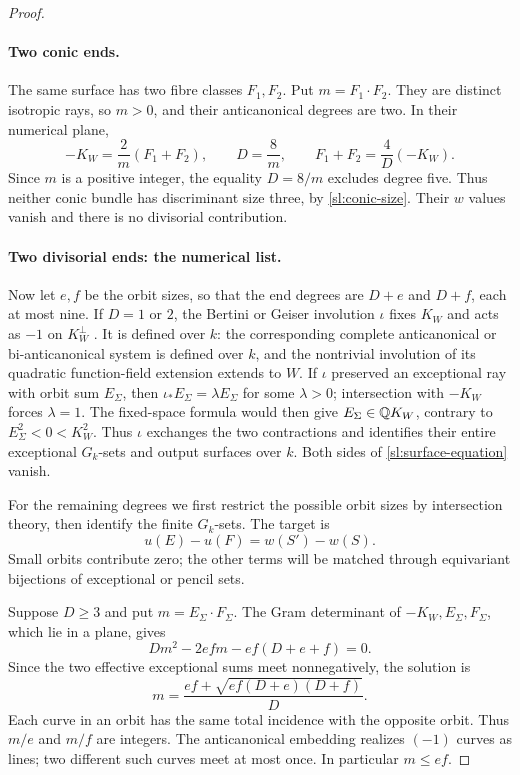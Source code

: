 \begin{proof}
\paragraph{Two conic ends.}
The same surface has two fibre classes $F_1,F_2$.  Put $m=F_1\cdot F_2$.
They are distinct isotropic rays, so $m>0$, and their anticanonical
degrees are two.  In their numerical plane,
\[
 -K_W=\frac2m(F_1+F_2),\qquad
 D=\frac8m,\qquad F_1+F_2=\frac4D(-K_W).
\]
Since $m$ is a positive integer, the equality $D=8/m$ excludes degree five.
Thus neither conic bundle has discriminant size three, by
\eqref{sl:conic-size}.  Their $w$ values vanish and there is no
divisorial contribution.

\paragraph{Two divisorial ends: the numerical list.}
Now let $e,f$ be the orbit sizes, so that the end degrees are $D+e$
and $D+f$, each at most nine.  If $D=1$ or $2$, the Bertini or Geiser involution $\iota$ fixes $K_W$
and acts as $-1$ on $K_W^\perp$
\cite[Sections~6.6 and~6.7]{DolgachevIskovskikh2009}.
It is defined over $k$: the corresponding complete anticanonical or
bi-anticanonical system is defined over $k$, and the nontrivial
involution of its quadratic function-field extension extends to $W$.
If $\iota$ preserved an exceptional ray with orbit sum $E_\Sigma$, then
$\iota_*E_\Sigma=\lambda E_\Sigma$ for some $\lambda>0$; intersection with $-K_W$
forces $\lambda=1$. The fixed-space formula would then give
$E_\Sigma\in\mathbb Q K_W$, contrary to $E_\Sigma^2<0<K_W^2$.
Thus $\iota$ exchanges the two contractions and identifies their entire
exceptional $G_k$-sets and output surfaces over $k$. Both sides of
\eqref{sl:surface-equation} vanish.

For the remaining degrees we first restrict the possible orbit sizes by
intersection theory, then identify the finite $G_k$-sets.  The target is
\[
 u(E)-u(F)=w(S')-w(S).
\]
Small orbits contribute zero; the other terms will be matched through
equivariant bijections of exceptional or pencil sets.

Suppose $D\geq3$ and put $m=E_\Sigma\cdot F_\Sigma$.  The Gram determinant of
$-K_W,E_\Sigma,F_\Sigma$, which lie in a plane, gives
\[
 Dm^2-2efm-ef(D+e+f)=0.
\]
Since the two effective exceptional sums meet nonnegatively, the
solution is
\begin{equation}\label{sl:intersection-formula}
 m=\frac{ef+\sqrt{ef(D+e)(D+f)}}D.
\end{equation}
Each curve in an orbit has the same total incidence with the opposite
orbit.  Thus $m/e$ and $m/f$ are integers.  The anticanonical embedding
realizes $(-1)$ curves as lines; two different such curves meet at most
once.  In particular $m\leq ef$.


\end{proof}
